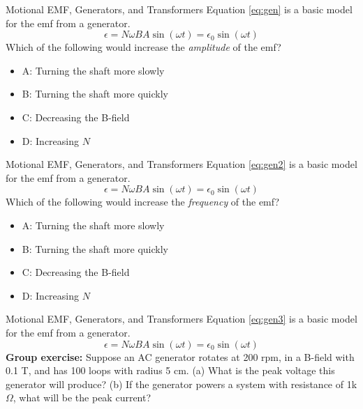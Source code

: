 \documentclass{beamer}
\begin{document}
\begin{frame}{Motional EMF, Generators, and Transformers}
Equation \ref{eq:gen} is a basic model for the emf from a generator.
\begin{equation}
\epsilon = N\omega BA \sin(\omega t) = \epsilon_0 \sin(\omega t) \label{eq:gen}
\end{equation}
Which of the following would increase the \textit{amplitude} of the emf?
\begin{itemize}
\item A: Turning the shaft more slowly
\item B: Turning the shaft more quickly
\item C: Decreasing the B-field
\item D: Increasing $N$
\end{itemize}
\end{frame}

\begin{frame}{Motional EMF, Generators, and Transformers}
Equation \ref{eq:gen2} is a basic model for the emf from a generator.
\begin{equation}
\epsilon = N\omega BA \sin(\omega t) = \epsilon_0 \sin(\omega t) \label{eq:gen2}
\end{equation}
Which of the following would increase the \textit{frequency} of the emf?
\begin{itemize}
\item A: Turning the shaft more slowly
\item B: Turning the shaft more quickly
\item C: Decreasing the B-field
\item D: Increasing $N$
\end{itemize}
\end{frame}

\begin{frame}{Motional EMF, Generators, and Transformers}
Equation \ref{eq:gen3} is a basic model for the emf from a generator.
\begin{equation}
\epsilon = N\omega BA \sin(\omega t) = \epsilon_0 \sin(\omega t) \label{eq:gen3}
\end{equation}
\textbf{Group exercise:} Suppose an AC generator rotates at 200 rpm, in a B-field with 0.1 T, and has 100 loops with radius 5 cm.  (a) What is the peak voltage this generator will produce? (b) If the generator powers a system with resistance of 1k$\Omega$, what will be the peak current?
\end{frame}
\end{document}
